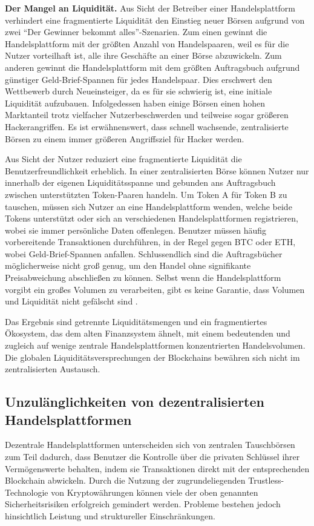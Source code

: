 \documentclass[UTF8,nofonts]{article}
\begin{document}
\begin{multicols}{2}
\textbf{Der Mangel an Liquidität.} Aus Sicht der Betreiber einer Handelsplattform verhindert eine fragmentierte Liquidität den Einstieg neuer Börsen aufgrund von zwei \enquote{Der Gewinner bekommt alles}-Szenarien. Zum einen gewinnt die Handelsplattform mit der größten Anzahl von Handelspaaren, weil es für die Nutzer vorteilhaft ist, alle ihre Geschäfte an einer Börse abzuwickeln. Zum anderen gewinnt die Handelsplattform mit dem größten Auftragsbuch aufgrund günstiger Geld-Brief-Spannen für jedes Handelspaar. Dies erschwert den Wettbewerb durch Neueinsteiger, da es für sie schwierig ist, eine initiale Liquidität aufzubauen. Infolgedessen haben einige Börsen einen hohen Marktanteil trotz vielfacher Nutzerbeschwerden und teilweise sogar größeren Hackerangriffen. Es ist erwähnenswert, dass schnell wachsende, zentralisierte Börsen zu einem immer größeren Angriffsziel für Hacker werden.

Aus Sicht der Nutzer reduziert eine fragmentierte Liquidität die Benutzerfreundlichkeit erheblich. In einer zentralisierten Börse können Nutzer nur innerhalb der eigenen Liquiditätsspanne und gebunden ans Auftragsbuch zwischen unterstützten Token-Paaren handeln. Um Token A für Token B zu tauschen, müssen sich Nutzer an eine Handelsplattform wenden, welche beide Tokens unterstützt oder sich an verschiedenen Handelsplattformen registrieren, wobei sie immer persönliche Daten offenlegen. Benutzer müssen häufig vorbereitende Transaktionen durchführen, in der Regel gegen BTC oder ETH, wobei Geld-Brief-Spannen anfallen. Schlussendlich sind die Auftragsbücher möglicherweise nicht groß genug, um den Handel ohne signifikante Preisabweichung abschließen zu können. Selbst wenn die Handelsplattform vorgibt ein großes Volumen zu verarbeiten, gibt es keine Garantie, dass Volumen und Liquidität nicht gefälscht sind \cite{fakevolume}.

Das Ergebnis sind getrennte Liquiditätsmengen und ein fragmentiertes Ökosystem, das dem alten Finanzsystem ähnelt, mit einem bedeutenden und zugleich auf wenige zentrale Handelsplattformen konzentrierten Handelsvolumen. Die globalen Liquiditätsversprechungen der Blockchains bewähren sich nicht im zentralisierten Austausch.

\subsection{Unzulänglichkeiten von dezentralisierten Handelsplattformen}
Dezentrale Handelsplattformen unterscheiden sich von zentralen Tauschbörsen zum Teil dadurch, dass Benutzer die Kontrolle über die privaten Schlüssel ihrer Vermögenswerte behalten, indem sie Transaktionen direkt mit der entsprechenden Blockchain abwickeln. Durch die Nutzung der zugrundeliegenden Trustless-Technologie von Kryptowährungen können viele der oben genannten Sicherheitsrisiken erfolgreich gemindert werden. Probleme bestehen jedoch hinsichtlich Leistung und struktureller Einschränkungen.


\end{multicols}
\end{document}

